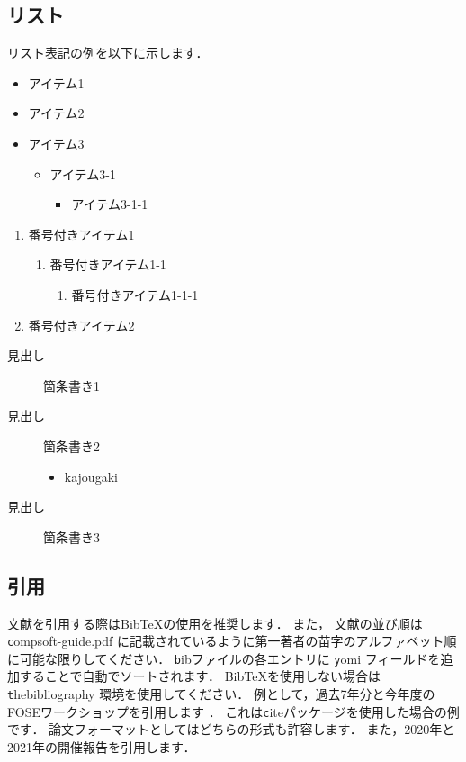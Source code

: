 \documentclass[T,J]{fose} %
\begin{document}
\subsection{リスト}

リスト表記の例を以下に示します．

\begin{itemize}
	\item アイテム1
	\item アイテム2
	\item アイテム3
	\begin{itemize}
		\item アイテム3-1
		\begin{itemize}
			\item アイテム3-1-1
		\end{itemize}
	\end{itemize}
\end{itemize}

\newpage

\begin{enumerate}
	\item 番号付きアイテム1
	\begin{enumerate}
		\item 番号付きアイテム1-1
		\begin{enumerate}
			\item 番号付きアイテム1-1-1
		\end{enumerate}
	\end{enumerate}
	\item 番号付きアイテム2
\end{enumerate}

\begin{description}
	\item[見出し] 箇条書き1
	\item[見出し] 箇条書き2
		\begin{itemize}
			\item kajougaki
		\end{itemize}
	\item[見出し] 箇条書き3
\end{description}


\subsection{引用}
文献を引用する際はBibTeXの使用を推奨します．
また， 文献の並び順は{\texttt compsoft-guide.pdf} に記載されているように第一著者の苗字のアルファベット順に可能な限りしてください．
{\texttt bib}ファイルの各エントリに {\texttt yomi} フィールドを追加することで自動でソートされます．
BibTeXを使用しない場合は {\texttt thebibliography} 環境を使用してください．
例として，過去7年分と今年度のFOSEワークショップを引用します
\cite{fose2015}
\cite{fose2016}
\cite{fose2017}
\cite{fose2018}
\cite{fose2019}
\cite{fose2020}
\cite{fose2021}
\cite{fose2022}
\cite{fose2023}
．
これは{\texttt cite}パッケージを使用した場合の例です\cite{fose2015,fose2016,fose2017,fose2018,fose2019,fose2020,fose2021,fose2022,fose2023}．
論文フォーマットとしてはどちらの形式も許容します．
また，2020年と2021年の開催報告を引用します\cite{fose2020report}\cite{fose2021report}．
\end{document}
